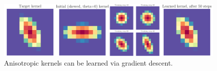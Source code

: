 \documentclass[a4paper, 12pt]{report}
\begin{document}
\begin{figure}[h!]
	\center
  \includegraphics[width=\textwidth]{figures/poc.png}
  \caption{Anisotropic kernels can be learned via gradient descent.}
  \label{fig:poc}
\end{figure}
\end{document}
